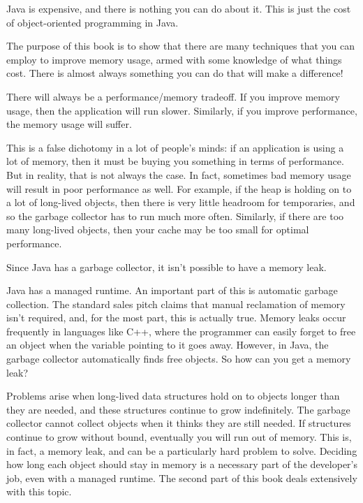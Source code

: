 {Java is expensive, and there is nothing you can do about it.
This is just the cost of object-oriented programming in Java.
}

The purpose of this book is to show that there are
many techniques that you can employ to improve memory usage, armed with some
knowledge of what things cost. There is almost always something you can do that
will make a difference!

{There will always be a performance/memory tradeoff. If you improve memory
usage, then the application will run slower. 
Similarly, if you improve performance, the memory usage will suffer.
} 

This is a false dichotomy in a lot of people's minds: if an application is
using a lot of memory, then it must be buying you something in terms of performance. 
But in reality, that is not always the case. In fact, sometimes bad memory usage will
result in poor performance as well. For example, if 
the heap is holding on to a lot of long-lived objects, then there is very little
headroom for temporaries, and so the garbage collector has to run much more
often.  Similarly, if there are too many long-lived objects, then your cache may
be too small for optimal performance.

{Since Java has a garbage collector, it isn't possible
to have a memory leak.
}

Java has a managed runtime. An important
part of this is automatic garbage collection. The standard sales pitch
claims that manual reclamation of memory isn't required, and, for
the most part, this is actually true. Memory leaks occur frequently in
languages like C++, where the programmer can easily forget to free an
object when the variable pointing to it goes away.  However, in Java, the
garbage collector automatically finds free objects. So how can you get a
memory leak?

Problems arise when long-lived data
structures hold on to objects longer than they are needed, and these structures
continue to grow indefinitely. The garbage collector cannot collect objects
when it thinks they are still needed. If structures continue to grow without
bound, eventually you will run out of memory. This is, in fact, a memory leak, 
and can be a particularly hard problem to solve. Deciding how long each object
should stay in memory is a necessary part of the developer's job, even with a
managed runtime. The second part of this book deals extensively with
this topic.

